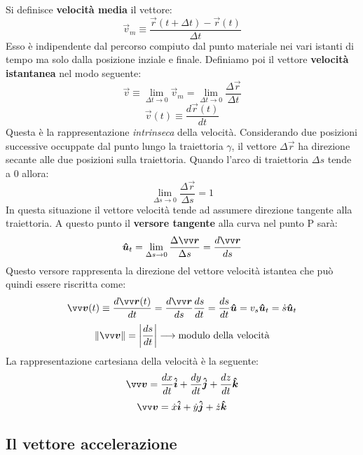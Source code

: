 \noindent Si definisce \textbf{velocità media} il vettore:
\[
     \vec{v}_m \equiv \frac{\vec{r}(t + \Delta t)-\vec{r}(t)}{\Delta t}    
\]
Esso è indipendente dal percorso compiuto dal punto materiale nei vari istanti di tempo ma solo dalla posizione
inziale e finale.
Definiamo poi il vettore \textbf{velocità istantanea} nel modo seguente:
\[
\vec{v} \equiv \lim_{\Delta t \to 0} \vec{v}_m = \lim_{\Delta t \to 0} \frac{\Delta \vec{r}}{\Delta t}      
\]
\[
\vec{v}(t) \equiv \frac{d \vec{r}(t)}{dt}   
\]
Questa è la rappresentazione \emph{intrinseca} della velocità. Considerando due posizioni successive occuppate dal 
punto lungo la traiettoria $\gamma $, il vettore $\Delta \vec{r}$ ha direzione secante alle due posizioni sulla traiettoria. 
Quando l'arco di traiettoria $\Delta s$ tende a 0 allora:
\[
    \lim_{\Delta s \to 0} \frac{\Delta \vec{r}}{\Delta s} = 1
\]
In questa situazione il vettore velocità tende ad assumere direzione tangente alla traiettoria. A questo punto il 
\textbf{versore tangente} alla curva nel punto P sarà:
\[
   \v{u}_t = \lim_{\Delta s \to 0} \frac{\Delta \vec{r}}{\Delta s} = \frac{d \vec{r}}{ds}
\]
Questo versore rappresenta la direzione del vettore velocità istantea che può quindi essere riscritta come:
\[
    \vec{v}(t) \equiv \frac{d \vec{r}(t)}{dt} = \frac{d\vec{r}}{ds} \frac{ds}{dt} = \frac{ds}{dt} \v{u}
    = v_s \v{u}_t = \dot{s} \v{u}_t 
\]
\[
 \Norm{v} =  \abs{\frac{ds}{dt} }    \longrightarrow \text{modulo della velocità}
\]
La rappresentazione cartesiana della velocità è la seguente:
\[
 \vec{v} =  \frac{dx}{dt} \v{i} + \frac{dy}{dt} \v{j} + \frac{dz}{dt} \v{k}    
\]
\[
\vec{v} = \dot{x}\v{i} +  \dot{y}\v{j} +  \dot{z}\v{k}    
\]
\subsection*{Il vettore accelerazione}

